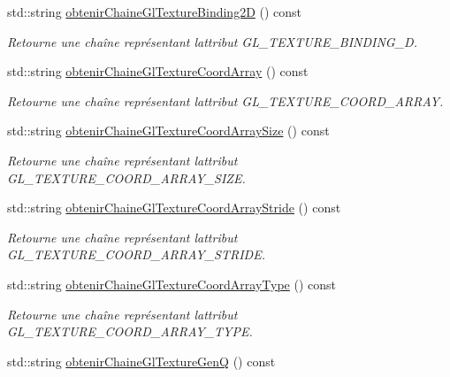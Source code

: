 \begin{DoxyCompactItemize}
std\+::string \hyperlink{group__utilitaire_ga308bae30bed330cc281e0f2443cb43d2}{obtenir\+Chaine\+Gl\+Texture\+Binding2\+D} () const 
\begin{DoxyCompactList}\small\item\em Retourne une chaîne représentant l\textquotesingle{}attribut G\+L\+\_\+\+T\+E\+X\+T\+U\+R\+E\+\_\+\+B\+I\+N\+D\+I\+N\+G\+\_\+D. \end{DoxyCompactList}\item 
std\+::string \hyperlink{group__utilitaire_ga6e3e42a091a09f20c4885d62bd29d1fb}{obtenir\+Chaine\+Gl\+Texture\+Coord\+Array} () const 
\begin{DoxyCompactList}\small\item\em Retourne une chaîne représentant l\textquotesingle{}attribut G\+L\+\_\+\+T\+E\+X\+T\+U\+R\+E\+\_\+\+C\+O\+O\+R\+D\+\_\+\+A\+R\+R\+A\+Y. \end{DoxyCompactList}\item 
std\+::string \hyperlink{group__utilitaire_ga874c08bb1dab5bf56279fa496f347017}{obtenir\+Chaine\+Gl\+Texture\+Coord\+Array\+Size} () const 
\begin{DoxyCompactList}\small\item\em Retourne une chaîne représentant l\textquotesingle{}attribut G\+L\+\_\+\+T\+E\+X\+T\+U\+R\+E\+\_\+\+C\+O\+O\+R\+D\+\_\+\+A\+R\+R\+A\+Y\+\_\+\+S\+I\+Z\+E. \end{DoxyCompactList}\item 
std\+::string \hyperlink{group__utilitaire_ga0cef5f78ea9815fc83b519aff2694d5b}{obtenir\+Chaine\+Gl\+Texture\+Coord\+Array\+Stride} () const 
\begin{DoxyCompactList}\small\item\em Retourne une chaîne représentant l\textquotesingle{}attribut G\+L\+\_\+\+T\+E\+X\+T\+U\+R\+E\+\_\+\+C\+O\+O\+R\+D\+\_\+\+A\+R\+R\+A\+Y\+\_\+\+S\+T\+R\+I\+D\+E. \end{DoxyCompactList}\item 
std\+::string \hyperlink{group__utilitaire_ga6cae6d3addddcf37939f5543fffab86f}{obtenir\+Chaine\+Gl\+Texture\+Coord\+Array\+Type} () const 
\begin{DoxyCompactList}\small\item\em Retourne une chaîne représentant l\textquotesingle{}attribut G\+L\+\_\+\+T\+E\+X\+T\+U\+R\+E\+\_\+\+C\+O\+O\+R\+D\+\_\+\+A\+R\+R\+A\+Y\+\_\+\+T\+Y\+P\+E. \end{DoxyCompactList}\item 
std\+::string \hyperlink{group__utilitaire_ga2bc696d575361d0668e25ab8f8455c21}{obtenir\+Chaine\+Gl\+Texture\+Gen\+Q} () const 

\end{DoxyCompactItemize}
